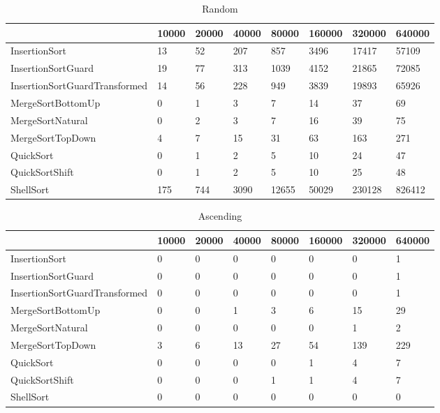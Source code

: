 \begin{table}[h]
\begin{tabular}{|l|l|l|l|l|l|l|l|}
\hline
 & 10000 & 20000 & 40000 & 80000 & 160000 & 320000 & 640000 \\ \hline
InsertionSort & 13 & 52 & 207 & 857 & 3496 & 17417 & 57109 \\ \hline
InsertionSortGuard & 19 & 77 & 313 & 1039 & 4152 & 21865 & 72085 \\ \hline
InsertionSortGuardTransformed & 14 & 56 & 228 & 949 & 3839 & 19893 & 65926 \\ \hline
MergeSortBottomUp & 0 & 1 & 3 & 7 & 14 & 37 & 69 \\ \hline
MergeSortNatural & 0 & 2 & 3 & 7 & 16 & 39 & 75 \\ \hline
MergeSortTopDown & 4 & 7 & 15 & 31 & 63 & 163 & 271 \\ \hline
QuickSort & 0 & 1 & 2 & 5 & 10 & 24 & 47 \\ \hline
QuickSortShift & 0 & 1 & 2 & 5 & 10 & 25 & 48 \\ \hline
ShellSort & 175 & 744 & 3090 & 12655 & 50029 & 230128 & 826412 \\ \hline
\end{tabular}
\caption{Random}
\end{table}
\begin{table}[h]
\begin{tabular}{|l|l|l|l|l|l|l|l|}
\hline
 & 10000 & 20000 & 40000 & 80000 & 160000 & 320000 & 640000 \\ \hline
InsertionSort & 0 & 0 & 0 & 0 & 0 & 0 & 1 \\ \hline
InsertionSortGuard & 0 & 0 & 0 & 0 & 0 & 0 & 1 \\ \hline
InsertionSortGuardTransformed & 0 & 0 & 0 & 0 & 0 & 0 & 1 \\ \hline
MergeSortBottomUp & 0 & 0 & 1 & 3 & 6 & 15 & 29 \\ \hline
MergeSortNatural & 0 & 0 & 0 & 0 & 0 & 1 & 2 \\ \hline
MergeSortTopDown & 3 & 6 & 13 & 27 & 54 & 139 & 229 \\ \hline
QuickSort & 0 & 0 & 0 & 0 & 1 & 4 & 7 \\ \hline
QuickSortShift & 0 & 0 & 0 & 1 & 1 & 4 & 7 \\ \hline
ShellSort & 0 & 0 & 0 & 0 & 0 & 0 & 0 \\ \hline
\end{tabular}
\caption{Ascending}
\end{table}

